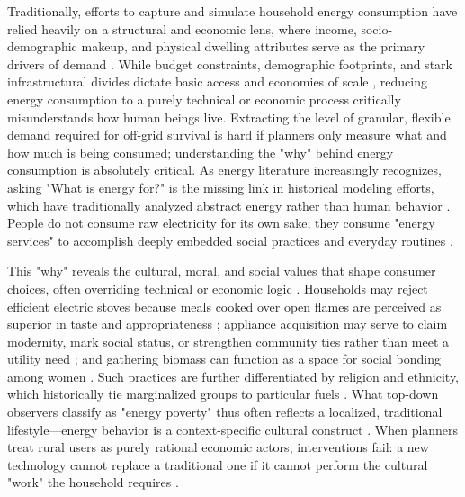 \documentclass[final,3p,times,onecolumn]{elsarticle}
\begin{document}
Traditionally, efforts to capture and simulate household energy consumption have relied heavily on a structural and economic lens, where income, socio-demographic makeup, and physical dwelling attributes serve as the primary drivers of demand \cite{pachauri_analysis_2004, Kowsari2011, poblete-cazenave_model_2021, richmond_drivers_2020}. While budget constraints, demographic footprints, and stark infrastructural divides dictate basic access and economies of scale \cite{jiang_rural_2020, kavousian_determinants_2013, zhao_survey_2019, azam_factors_2015, dominguez_estimating_2021}, reducing energy consumption to a purely technical or economic process critically misunderstands how human beings live. Extracting the level of granular, flexible demand required for off-grid survival is hard if planners only measure what and how much is being consumed; understanding the "why" behind energy consumption is absolutely critical. As energy literature increasingly recognizes, asking "What is energy for?" is the missing link in historical modeling efforts, which have traditionally analyzed abstract energy rather than human behavior \cite{Kowsari2011, shove_what_2014}. People do not consume raw electricity for its own sake; they consume "energy services" to accomplish deeply embedded social practices and everyday routines \cite{shove_what_2014, day_conceptualising_2016}.

This "why" reveals the cultural, moral, and social values that shape consumer choices, often overriding technical or economic logic \cite{Kowsari2011}. Households may reject efficient electric stoves because meals cooked over open flames are perceived as superior in taste and appropriateness \cite{kumar_non-universal_2020}; appliance acquisition may serve to claim modernity, mark social status, or strengthen community ties rather than meet a utility need \cite{tesfamichael_eager_2020}; and gathering biomass can function as a space for social bonding among women \cite{louw_determinants_2008}. Such practices are further differentiated by religion and ethnicity, which historically tie marginalized groups to particular fuels \cite{richmond_drivers_2020}. What top-down observers classify as "energy poverty" thus often reflects a localized, traditional lifestyle—energy behavior is a context-specific cultural construct \cite{kumar_non-universal_2020}. When planners treat rural users as purely rational economic actors, interventions fail: a new technology cannot replace a traditional one if it cannot perform the cultural "work" the household requires \cite{chattopadhyay_can_2024, shove_what_2014}.
\end{document}
